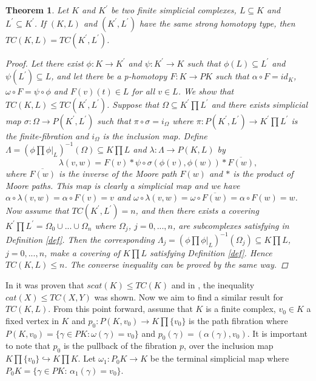 \documentclass[preprint,11pt %
]{hjm1}
\newtheorem{theorem}{Theorem}[section]
\theoremstyle{definition}
\begin{document}
\begin{theorem}%
Let $K$ and $K^{'}$ be two finite simplicial complexes, $L\subseteq K$ and $L^{'}\subseteq K^{'}$. If $(K,L)$ and $(K^{'},L^{'})$ have the same strong homotopy type, then $TC(K,L)=TC(K^{'},L^{'})$.

\begin{proof}
Let there exist $\phi :K\rightarrow K^{'}$ and $\psi :K^{'}\to K $ such that $\phi (L)\subseteq L^{'}$ and $\psi (L^{'})\subseteq L$, and let there be a p-homotopy $F:K\to PK$ such that $\alpha \circ F=id_K$, $\omega \circ F=\psi \circ \phi $ and $F(v)(t)\in L$ for all $v\in L$. We show that $TC(K,L)\leq TC(K^{'},L^{'})$. Suppose that $\Omega \subseteq K^{'}\prod L^{'}$ and there exists simplicial map $\sigma :\Omega \to P(K^{'},L^{'})$ such that $\pi \circ \sigma =i_{\Omega }$ where $\pi :P(K^{'},L^{'})\to  K^{'}\prod L^{'}$ is the finite-fibration and $i_{\Omega }$ is the inclusion map. Define $\Lambda =(\phi \prod \phi \vert _L)^{-1}(\Omega )\subseteq K \prod L$ and $\lambda :\Lambda \to P(K,L)$ by 
\[
\lambda (v,w)= F(v) \ast \psi \circ \sigma (\phi (v),\phi (w))\ast \overline{F(w)},
\]
where $\overline{F(w)}$ is the inverse of the Moore path $F(w)$ and $\ast$ is the product of Moore paths. This map is clearly a simplicial map and we have 
$\alpha \circ \lambda (v,w)=\alpha \circ F(v)=v$ and $\omega \circ \lambda (v,w)=\omega \circ \overline{F(w)}=\alpha \circ F(w)=w$. Now assume that $TC(K^{'},L^{'})=n$, and then there exists a covering $K^{'}\prod L^{'}=\Omega _0\cup ...\cup \Omega _n$ where $\Omega _j$, $j=0,...,n$, are subcomplexes satisfying in Definition \ref{def}. Then the corresponding $\Lambda _j=(\phi \prod \phi \vert _L)^{-1}(\Omega _j)\subseteq K \prod L$, $j=0,...,n$, make a covering of $K \prod L$ satisfying Definition \ref{def}. Hence $TC(K,L)\leq n$. The converse inequality can be proved by the same way.
\end{proof}
\end{theorem}



In \cite{dis} it was proven that $scat(K) \leq TC(K)$ and in \cite{rel}, the inequality $cat (X)\leq TC(X,Y)$ was shown. Now we aim to find a similar result for $TC(K,L)$.
From this point forward, assume that $K$ is a finite complex, $v_0 \in K$ a fixed vertex in $K$ and $p_0:P(K,v_0)\to K\prod \lbrace v_0 \rbrace $ is the path fibration where $P(K,v_0)=\lbrace      \gamma \in PK: \omega (\gamma )=v_0      \rbrace$ and $p_0 (\gamma)=(\alpha (\gamma),v_0)$. It is important to note that $p_0$ is the pullback of the fibration $p$, over the inclusion map $K\prod \lbrace v_0 \rbrace \hookrightarrow K\prod K$. Let  $\omega_1: P_0 K \to K$ be the terminal simplicial map where $P_0 K = \{ \gamma \in PK :\, \alpha_1 (\gamma )=v_0\}$.
\end{document}
